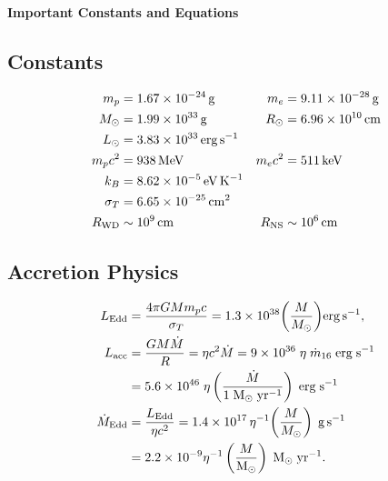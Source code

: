 \clearpage
{}
\thispagestyle{empty}
\fancyhf{}
\renewcommand{\headrulewidth}{0pt}
\begin{center}
{\Large \textbf{Important Constants and Equations}}
\end{center}
\setlength{\abovedisplayskip}{4pt}
\setlength{\belowdisplayskip}{4pt}
\begin{multicols}{2}
\setlength{\columnseprule}{0pt}
\setlength{\columnsep}{0.8cm}

\subsection*{Constants}
\footnotesize
\[
\begin{aligned}
  m_p &= 1.67\times10^{-24}\,{\rm g} &
  m_e &= 9.11\times10^{-28}\,{\rm g} \\
  M_\odot &= 1.99\times10^{33}\,{\rm g} &
  R_\odot &= 6.96\times10^{10}\,{\rm cm} \\
  L_\odot &= 3.83\times10^{33}\,{\rm erg\,s^{-1}} \\
  m_p c^2 &= 938\,{\rm MeV} &
  m_e c^2 &= 511\,{\rm keV} \\
  k_B &= 8.62\times10^{-5}\,{\rm eV\,K^{-1}} \\
  \sigma_T &= 6.65\times10^{-25}\,{\rm cm^2} \\
  R_{\rm WD} &\sim 10^9\,{\rm cm} &
  R_{\rm NS} &\sim 10^6\,{\rm cm}
\end{aligned}
\]
\subsection*{Accretion Physics}
\footnotesize
\[
\begin{aligned}
L_{\rm Edd} &= \frac{4\pi G M m_p c}{\sigma_T}
= 1.3\times10^{38}\!\left(\frac{M}{M_\odot}\right)\!{\rm erg\,s^{-1}},\\
L_{\rm acc} &= \frac{GM\dot M}{R} = \eta c^2 \dot{M} = 9\times 10^{36} \;\eta\;\dot{m}_{16}\; {\rm erg\;s^{-1}}\\
&= 5.6\times10^{46}\;\eta \left(\frac{\dot{M}}{1\;{\rm M_\odot\;yr^{-1}}}\right) \;{\rm erg\;s^{-1}}\\
\dot M_{\rm Edd} &= \frac{L_{\rm Edd}}{\eta c^2}
= 1.4\times10^{17}\,\eta^{-1}
\!\left(\frac{M}{M_\odot}\right)\;{\rm g\,s^{-1}}\\
&= 2.2 \times 10^{-9} \eta^{-1} \left(\frac{M}{\rm M_\odot}\right)\; {\rm M_\odot \; yr^{-1}}.
\end{aligned}
\]

\end{multicols}
